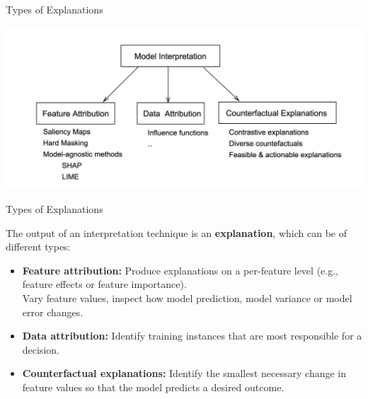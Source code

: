 \documentclass[11pt,compress,t,notes=noshow, aspectratio=169, xcolor=table]{beamer}
\begin{document}
\begin{frame}{Types of Explanations}
	\begin{center}
		\includegraphics[width=\textwidth]{figure/1-attributions.png}
    \end{center}
\end{frame}



\begin{frame}{Types of Explanations}

	The output of an interpretation technique is an \textbf{explanation}, which can be of different types:

    \medskip

	\begin{itemize}
  \itemsep1em
	\item
		\textbf{Feature attribution:} Produce explanations on a per-feature level (e.g., feature effects or feature importance).
		\\
		Vary feature values, inspect how model prediction, model variance or model error changes.

	\item
		\textbf{Data attribution:}
		Identify training instances that are most responsible for a decision.

	\item
	   \textbf{Counterfactual explanations:}
	   Identify the smallest necessary change in feature values so that the model predicts a desired outcome.
	   \\

	\end{itemize}

\end{frame}
\end{document}
